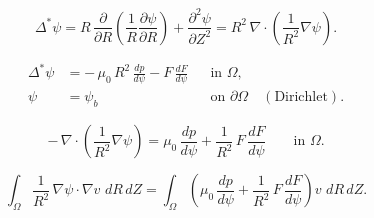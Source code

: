 

\begin{equation}
  \Delta^{*}\psi
  = R\,\frac{\partial}{\partial R}\!\left(\frac{1}{R}\frac{\partial \psi}{\partial R}\right)
  + \frac{\partial^{2}\psi}{\partial Z^{2}}
  = R^{2}\,\nabla\!\cdot\!\left(\frac{1}{R^{2}}\nabla\psi\right).
\end{equation}

\begin{align}
  \Delta^{*}\psi
  &= -\,\mu_{0}\,R^{2}\,\frac{dp}{d\psi} - F\,\frac{dF}{d\psi}
  && \text{in } \Omega, \\
  \psi &= \psi_{b}
  && \text{on } \partial\Omega \quad (\text{Dirichlet}).
\end{align}

\begin{equation}
  -\,\nabla\!\cdot\!\left(\frac{1}{R^{2}}\nabla\psi\right)
  = \mu_{0}\,\frac{dp}{d\psi} + \frac{1}{R^{2}}\,F\,\frac{dF}{d\psi}
  \qquad \text{in } \Omega.
\end{equation}

\begin{equation}
  \int_{\Omega} \frac{1}{R^{2}}\,\nabla\psi\cdot\nabla v \,\, dR\,dZ
  = \int_{\Omega}\!\left(\mu_{0}\,\frac{dp}{d\psi}
  + \frac{1}{R^{2}}\,F\,\frac{dF}{d\psi}\right) v \,\, dR\,dZ .
\end{equation}
